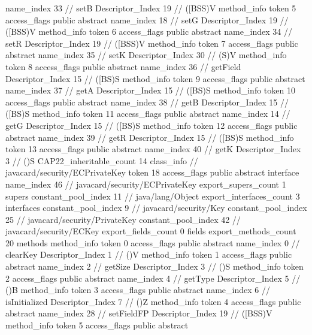 {{{{{					name_index	33		// setB
					Descriptor_Index	19		// ([BSS)V
				}
				method_info {
					token	5
					access_flags	public abstract
					name_index	18		// setG
					Descriptor_Index	19		// ([BSS)V
				}
				method_info {
					token	6
					access_flags	public abstract
					name_index	34		// setR
					Descriptor_Index	19		// ([BSS)V
				}
				method_info {
					token	7
					access_flags	public abstract
					name_index	35		// setK
					Descriptor_Index	30		// (S)V
				}
				method_info {
					token	8
					access_flags	public abstract
					name_index	36		// getField
					Descriptor_Index	15		// ([BS)S
				}
				method_info {
					token	9
					access_flags	public abstract
					name_index	37		// getA
					Descriptor_Index	15		// ([BS)S
				}
				method_info {
					token	10
					access_flags	public abstract
					name_index	38		// getB
					Descriptor_Index	15		// ([BS)S
				}
				method_info {
					token	11
					access_flags	public abstract
					name_index	14		// getG
					Descriptor_Index	15		// ([BS)S
				}
				method_info {
					token	12
					access_flags	public abstract
					name_index	39		// getR
					Descriptor_Index	15		// ([BS)S
				}
				method_info {
					token	13
					access_flags	public abstract
					name_index	40		// getK
					Descriptor_Index	3		// ()S
				}
			}
			CAP22_inheritable_count	14
		}
		class_info {		// javacard/security/ECPrivateKey
			token	18
			access_flags	public abstract interface
			name_index	46		// javacard/security/ECPrivateKey
			export_supers_count	1
			supers {
				constant_pool_index	11		// java/lang/Object
			}
			export_interfaces_count	3
			interfaces {
				constant_pool_index	9		// javacard/security/Key
				constant_pool_index	25		// javacard/security/PrivateKey
				constant_pool_index	42		// javacard/security/ECKey
			}
			export_fields_count	0
			fields {
			}
			export_methods_count	20
			methods {
				method_info {
					token	0
					access_flags	public abstract
					name_index	0		// clearKey
					Descriptor_Index	1		// ()V
				}
				method_info {
					token	1
					access_flags	public abstract
					name_index	2		// getSize
					Descriptor_Index	3		// ()S
				}
				method_info {
					token	2
					access_flags	public abstract
					name_index	4		// getType
					Descriptor_Index	5		// ()B
				}
				method_info {
					token	3
					access_flags	public abstract
					name_index	6		// isInitialized
					Descriptor_Index	7		// ()Z
				}
				method_info {
					token	4
					access_flags	public abstract
					name_index	28		// setFieldFP
					Descriptor_Index	19		// ([BSS)V
				}
				method_info {
					token	5
					access_flags	public abstract
}}}}}
